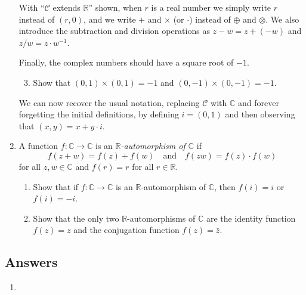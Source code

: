 \begin{enumerate}
\begin{enumerate}
\end{enumerate}
With ``$\mathcal{C}$ extends $\mathbb{R}$'' shown, when $r$ is a real number we simply write $r$ instead of $(r,0)$, and we write $+$ and $\times$ (or $\cdot$) instead of $\oplus$ and $\otimes$. We also introduce the subtraction and division operations as $z - w = z + (-w)$ and $z/w = z\cdot w^{-1}$.\par
Finally, the complex numbers should have a square root of $-1$.
\begin{enumerate}\setcounter{enumii}{2}
\item Show that $(0,1)\times (0,1) = -1$ and $(0,-1)\times (0,-1) = -1$.
\end{enumerate}
We can now recover the usual notation, replacing $\mathcal{C}$ with $\mathbb{C}$ and forever forgetting the initial definitions, by defining $i = (0,1)$ and then observing that $(x,y) = x + y\cdot i$.
\item A function $f:\mathbb{C}\to\mathbb{C}$ is an \emph{$\mathbb{R}$-automorphism of $\mathbb{C}$} if
\begin{equation*}
f(z + w) = f(z) + f(w)\quad\text{and}\quad f(zw) = f(z)\cdot f(w)
\end{equation*}
for all $z,w\in\mathbb{C}$ and $f(r) = r$ for all $r\in\mathbb{R}$.
\begin{enumerate}
\item Show that if $f:\mathbb{C}\to\mathbb{C}$ is an $\mathbb{R}$-automorphism of $\mathbb{C}$, then $f(i) = i$ or $f(i) = -i$.
\item Show that the only two $\mathbb{R}$-automorphisms of $\mathbb{C}$ are the identity function $f(z) = z$ and the conjugation function $f(z) = \bar{z}$.
\end{enumerate}
\end{enumerate}


\newpage
\subsection{Answers}

\begin{enumerate}
\item 
\end{enumerate}